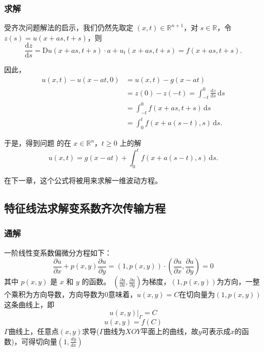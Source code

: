 \documentclass[12pt,a4paper]{article}
\numberwithin{subsection}{section}   %
\numberwithin{subsubsection}{subsection}
\theoremstyle{plain}
\theoremstyle{definition}
\theoremstyle{remark}
\theoremstyle{remark}
\begin{document}
\subsubsection{求解}
	受齐次问题解法的启示，我们仍然先取定 \((x, t) \in \mathbb{R}^{n+1}\)，对 \(s \in \mathbb{R}\)，令 \(z(s) = u(x + a s, t + s)\)，则
		\begin{equation}
	\frac{\mathrm{d}z}{\mathrm{d}s} = \mathrm{D}u(x + a s, t + s) \cdot a + u_t(x + a s, t + s) = f(x + a s, t + s).
		\end{equation}
	
	因此，
	\begin{equation}
	\begin{aligned}
		u(x, t) -	u(x-at,0)&= u(x, t)-g(x - a t) \\
		&= z(0) - z(-t) = \int_{-t}^0 \frac{\mathrm{d}z}{\mathrm{d}s} \, \mathrm{d}s \\
		&= \int_{-t}^0 f(x + a s, t + s) \, \mathrm{d}s \\
		&= \int_0^t f(x + a (s - t), s) \, \mathrm{d}s.
	\end{aligned}
\end{equation}
	
	于是，得到问题 的在 \(x \in \mathbb{R}^n\)，\(t \geq 0\) 上的解
	\begin{equation}\label{eq:非齐次解1}
		u(x, t) = g(x - a t) + \int_0^t f(x + a (s - t), s) \, \mathrm{d}s.
	\end{equation}
	
	在下一章，这个公式将被用来求解一维波动方程。
	
	
	
	\subsection{特征线法求解变系数齐次传输方程} 
	\subsubsection{通解} 
	一阶线性变系数偏微分方程如下：
	\begin{equation}\label{eq:pde_original2}
		\frac{\partial u}{\partial x} + p(x,y) \frac{\partial u}{\partial y}=(1, p(x, y)) \cdot \left( \frac{\partial u}{\partial x}, \frac{\partial u}{\partial y} \right) = 0 
	\end{equation}
	其中 $p(x, y)$ 是 $x$ 和 $y$ 的函数。
	$\left( \frac{\partial u}{\partial x}, \frac{\partial u}{\partial y} \right)$为梯度，$(1, p(x, y))$为方向，一整个乘积为方向导数，方向导数为0意味着，$u(x, y)=C$在切向量为$(1, p(x, y))$这条曲线上，即
	\begin{equation}
		u(x,y)|_{\Gamma} = C
	\end{equation}
	\begin{equation}
		u(x,y) =  f(C)
	\end{equation}
	$\Gamma$曲线上，任意点$(x, y)$求导($\Gamma$曲线为$XOY$平面上的曲线，故$y$可表示成$x$的函数)，可得切向量$(1,\frac{dy}{dx})$
	
\end{document}
